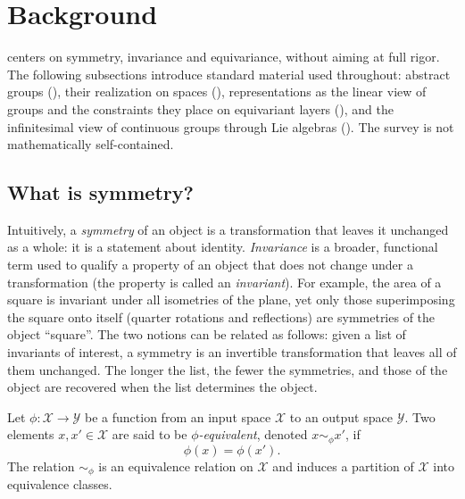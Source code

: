 \documentclass[mathematics,review,submit,moreauthors]{Definitions/mdpi}
\begin{document}
\section{Background}\label{sec:background}
 centers on symmetry, invariance and equivariance, without aiming at full rigor.
The following subsections introduce standard material used throughout: abstract groups (), their realization on spaces (), representations as the linear view of groups and the constraints they place on equivariant layers (), and the infinitesimal view of continuous groups through Lie algebras ().
The survey is not mathematically self-contained.

\subsection{What is symmetry?}\label{sec:what-is-sym}
Intuitively, a \emph{symmetry} of an object is a transformation that leaves it unchanged as a whole: it is a statement about identity.
\emph{Invariance} is a broader, functional term used to qualify a property of an object that does not change under a transformation (the property is called an \emph{invariant}).
For example, the area of a square is invariant under all isometries of the plane, yet only those superimposing the square onto itself (quarter rotations and reflections) are symmetries of the object ``square''.
The two notions can be related as follows: given a list of invariants of interest, a symmetry is an invertible transformation that leaves all of them unchanged.
The longer the list, the fewer the symmetries, and those of the object are recovered when the list determines the object.

\begin{Definition}\label{def:equivalence}
    Let $\phi : \mathcal{X} \to \mathcal{Y}$ be a function from an input space $\mathcal{X}$ to an output space $\mathcal{Y}$.
    Two elements $x, x' \in \mathcal{X}$ are said to be \emph{$\phi$-equivalent}, denoted $x \sim_{\phi} x'$, if
    \[
        \phi(x) = \phi(x').
    \]
    The relation $\sim_{\phi}$ is an equivalence relation on $\mathcal{X}$ and induces a partition of $\mathcal{X}$ into equivalence classes.
\end{Definition}
\end{document}
